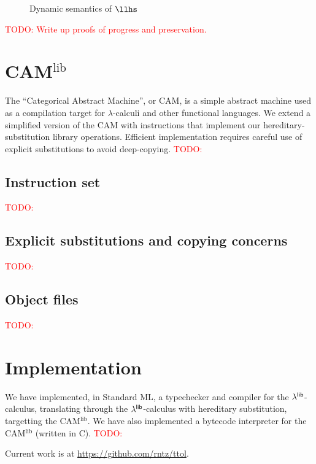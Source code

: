 \documentclass[11pt]{article}
\newcommand{\todo}[1]{\textcolor{red}{\small TODO: #1}}
\begin{document}
\begin{figure}
  \caption{Dynamic semantics of $\llhs$}
  \label{fig:llhsdynsem}
\end{figure}

\todo{Write up proofs of progress and preservation.}


\newcommand{\camlib}{CAM\ensuremath{^{\text{lib}}}}
\section{\camlib{}}

The ``Categorical Abstract Machine'', or CAM, is a simple abstract machine used
as a compilation target for $\lambda$-calculi and other functional languages. We
extend a simplified version of the CAM with instructions that implement our
hereditary-substitution library operations. Efficient implementation requires
careful use of explicit substitutions to avoid deep-copying. \todo{}

\subsection{Instruction set}
\todo{}

\subsection{Explicit substitutions and copying concerns}
\todo{}

\subsection{Object files}
\todo{}


\section{Implementation}

We have implemented, in Standard ML, a typechecker and compiler for the
$\lambda^{\textsf{lib}}$-calculus, translating through the $\lambda^{\textsf{lib}}$-calculus with hereditary
substitution, targetting the \camlib{}. We have also implemented a bytecode
interpreter for the \camlib{} (written in C). \todo{}

Current work is at \url{https://github.com/rntz/ttol}.


\newpage


\end{document}

